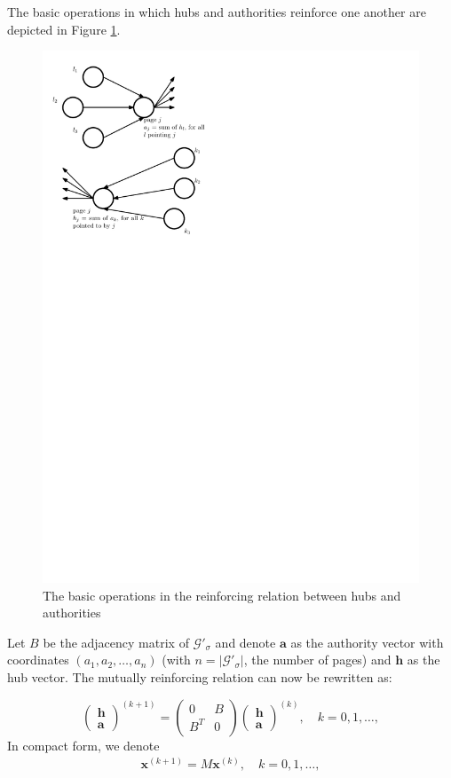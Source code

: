 \documentclass[a4paper,11pt]{report}
\newcommand{\graf}{\mathscr{G}}
\begin{document}
The basic operations in which hubs and authorities reinforce one another are 
depicted in Figure \ref{reinforcing}.
\begin{figure}[h!]
  \centering
  \includegraphics[scale=1]{fig2hits.pdf}\caption{The basic operations in the reinforcing relation between hubs and authorities}\label{reinforcing}
\end{figure}

Let $B$ be the adjacency matrix of $\graf'_\sigma$ and denote $\mathbf{a}$ as the authority vector with coordinates $(a_1,a_2,\ldots,a_n)$ (with $n = 
 |\graf'_\sigma|$, the number of pages) and $\mathbf{h}$ as the hub vector. The mutually reinforcing relation can now be rewritten 
as:

$$\begin{pmatrix} 
\textbf{h}\\
\textbf{a}
\end{pmatrix}^{(k+1)} = \begin{pmatrix} 
0 & B\\
B^T & 0
\end{pmatrix} \begin{pmatrix} 
\textbf{h}\\
\textbf{a}
\end{pmatrix}^{(k)},\quad k = 0, 1,\ldots,$$
In compact form, we denote
\begin{eqnarray}\label{compactform}
  \mathbf{x}^{(k+1)} = M\mathbf{x}^{(k)},\quad k = 0, 1,\ldots,
\end{eqnarray}
\end{document}
